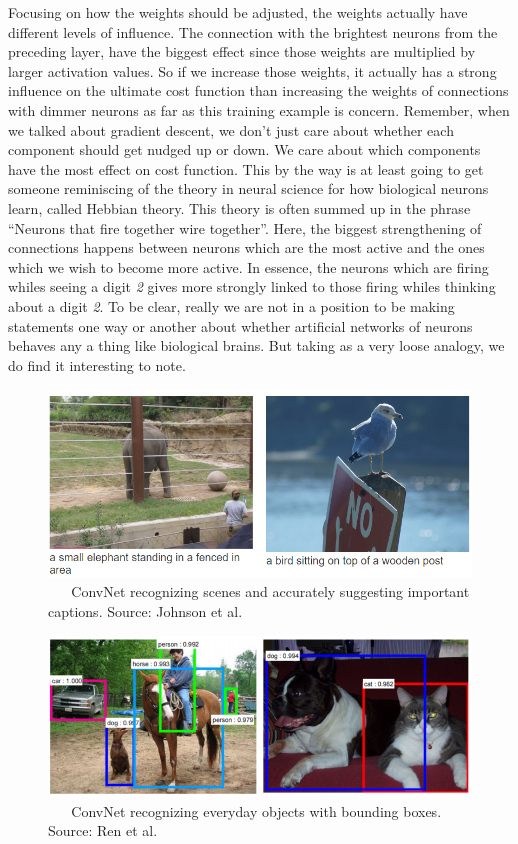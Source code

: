 \documentclass[master]{thesis-uestc}
\begin{document}
Focusing on how the weights should be adjusted, the weights actually have different levels of influence. The connection with the brightest neurons from the preceding layer, have the biggest effect since those weights are multiplied by larger activation values. So if we increase those weights, it actually has a strong influence on the ultimate cost function than increasing the weights of connections with dimmer neurons as far as this training example is concern. Remember, when we talked about gradient descent, we don't just care about whether each component should get nudged up or down. We care about which components have the most effect on cost function. This by the way is at least going to get someone reminiscing of the theory in neural science for how biological neurons learn, called Hebbian theory\cite{Donald1949}. This theory is often summed up in the phrase ``Neurons that fire together wire together''. Here, the biggest strengthening of connections happens between neurons which are the most active and the ones which we wish to become more active. In essence, the neurons which are firing whiles seeing a digit \textit{2} gives more strongly linked to those firing whiles thinking about a digit \textit{2}. To be clear, really we are not in a position to be making statements one way or another about whether artificial networks of neurons behaves any a thing like biological brains. But taking as a very loose analogy, we do find it interesting to note.

\begin{figure}[ht]
\includegraphics[width=5in]{pic/CNN_example.PNG}
\caption{\,\,\,\,\,\,\,\,\,\,ConvNet recognizing scenes and accurately suggesting important captions. Source: Johnson et al.\cite{densecap}}
\label{cnn_example}
\end{figure}

\begin{figure}[ht]
\includegraphics[width=5in]{pic/everyday_objects.PNG}
\caption{\,\,\,\,\,\,\,\,\,\,ConvNet recognizing everyday objects with bounding boxes. Source: Ren et al.\cite{DBLP:journals/corr/RenHG015}}
\label{everyday_objects}
\end{figure}
\end{document}
